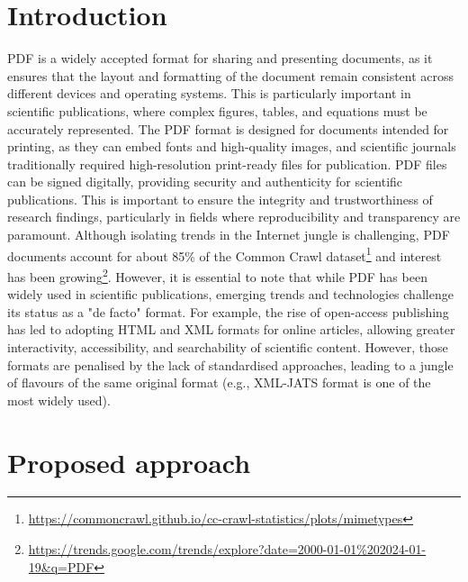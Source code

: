 \section{Introduction}

PDF is a widely accepted format for sharing and presenting documents, as it ensures that the layout and formatting of the document remain consistent across different devices and operating systems. This is particularly important in scientific publications, where complex figures, tables, and equations must be accurately represented.
The PDF format is designed for documents intended for printing, as they can embed fonts and high-quality images, and scientific journals traditionally required high-resolution print-ready files for publication. 
PDF files can be signed digitally, providing security and authenticity for scientific publications. This is important to ensure the integrity and trustworthiness of research findings, particularly in fields where reproducibility and transparency are paramount.
Although isolating trends in the Internet jungle is challenging, PDF documents account for about 85\% of the Common Crawl dataset\footnote{\url{https://commoncrawl.github.io/cc-crawl-statistics/plots/mimetypes}} and interest has been growing\footnote{\url{https://trends.google.com/trends/explore?date=2000-01-01\%202024-01-19&q=PDF}}. 
However, it is essential to note that while PDF has been widely used in scientific publications, emerging trends and technologies challenge its status as a "de facto" format. For example, the rise of open-access publishing has led to adopting HTML and XML formats for online articles, allowing greater interactivity, accessibility, and searchability of scientific content.
However, those formats are penalised by the lack of standardised approaches, leading to a jungle of flavours of the same original format (e.g., XML-JATS format is one of the most widely used).

\section{Proposed approach}

